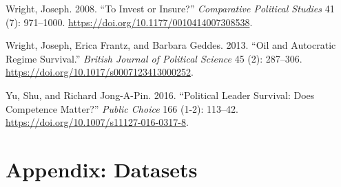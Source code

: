\documentclass[
  12pt,
]{report}
\newlength{\cslhangindent}
\newenvironment{CSLReferences}[2] %
 {\begin{list}{}{%
  \setlength{\itemindent}{0pt}
  \setlength{\leftmargin}{0pt}
  \setlength{\parsep}{0pt}
  \ifodd #1
   \setlength{\leftmargin}{\cslhangindent}
   \setlength{\itemindent}{-1\cslhangindent}
  \fi
  \setlength{\itemsep}{#2\baselineskip}}}
 {\end{list}}
\begin{document}
\begin{CSLReferences}{1}{0}
Wright, Joseph. 2008. {``To Invest or Insure?''} \emph{Comparative
Political Studies} 41 (7): 971--1000.
\url{https://doi.org/10.1177/0010414007308538}.

Wright, Joseph, Erica Frantz, and Barbara Geddes. 2013. {``Oil and
Autocratic Regime Survival.''} \emph{British Journal of Political
Science} 45 (2): 287--306.
\url{https://doi.org/10.1017/s0007123413000252}.

Yu, Shu, and Richard Jong-A-Pin. 2016. {``Political Leader Survival:
Does Competence Matter?''} \emph{Public Choice} 166 (1-2): 113--42.
\url{https://doi.org/10.1007/s11127-016-0317-8}.

\end{CSLReferences}

\chapter*{\texorpdfstring{Appendix\textbf{:
Datasets}}{Appendix: Datasets}}\label{appendix-datasets}
\end{document}
